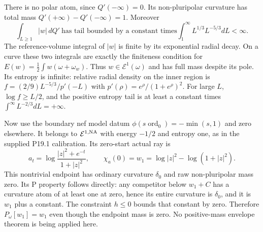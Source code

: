 \documentclass[
  11pt,
]{article}
\begin{document}
There is no polar atom, since \(Q'(-\infty)=0\). Its non-pluripolar
curvature has total mass \(Q'(+\infty)-Q'(-\infty)=1\). Moreover \[
 \int_{L\geq1}|w|\,dQ'\ \text{has tail bounded by a constant times}
             \int_1^\infty L^{1/3}L^{-5/3}dL<\infty.
\] The reference-volume integral of \(|w|\) is finite by its exponential
radial decay. On a curve these two integrals are exactly the finiteness
condition for \(E(w)=\tfrac12\int w(\omega+\omega_w)\). Thus
\(w\in\mathcal E^1(\omega)\) and has full mass despite its pole. Its
entropy is infinite: relative radial density on the inner region is
\(f=(2/9)L^{-5/3}/p'(-L)\) with \(p'(\rho)=e^\rho/(1+e^\rho)^2\). For
large \(L\), \(\log f\geq L/2\), and the positive entropy tail is at
least a constant times \(\int^\infty L^{-2/3}dL=+\infty\).

Now use the boundary nef model datum
\(\phi(s\operatorname{ord}_0)=-\min(s,1)\) and zero elsewhere. It
belongs to \(\mathcal E^{1,\rm NA}\) with energy \(-1/2\) and entropy
one, as in the supplied P19.1 calibration. Its zero-start actual ray is
\[ a_t=\log\frac{|z|^2+e^{-t}}{1+|z|^2},\qquad
 \chi_a(0)=w_1=\log|z|^2-\log(1+|z|^2).\] This nontrivial endpoint has
ordinary curvature \(\delta_0\) and raw non-pluripolar mass zero. Its P
property follows directly: any competitor below \(w_1+C\) has a
curvature atom of at least one at zero, hence its entire curvature is
\(\delta_0\), and it is \(w_1\) plus a constant. The constraint
\(h\leq0\) bounds that constant by zero. Therefore \(P_\omega[w_1]=w_1\)
even though the endpoint mass is zero. No positive-mass envelope theorem
is being applied here.
\end{document}
